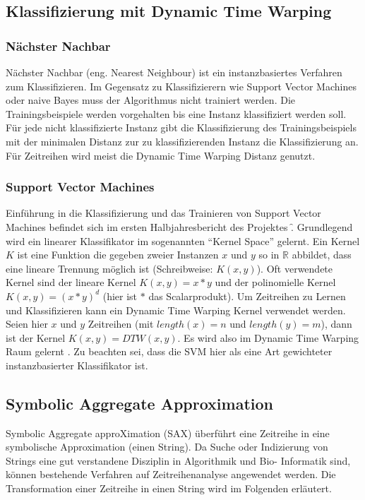 \subsection{Klassifizierung mit Dynamic Time Warping}
\subsubsection{Nächster Nachbar} Nächster Nachbar (eng. Nearest
Neighbour) ist ein instanzbasiertes Verfahren zum Klassifizieren. Im
Gegensatz zu Klassifizierern wie Support Vector Machines oder naive
Bayes muss der Algorithmus nicht trainiert werden. Die
Trainingsbeispiele werden vorgehalten bis eine Instanz klassifiziert
werden soll. Für jede nicht klassifizierte Instanz gibt die
Klassifizierung des Trainingsbeispiels mit der minimalen Distanz zur
zu klassifizierenden Instanz die Klassifizierung an.  Für Zeitreihen
wird meist die Dynamic Time Warping Distanz genutzt.
\subsubsection{Support Vector Machines} %
Einführung in die Klassifizierung und das Trainieren von Support
Vector Machines befindet sich im ersten Halbjahresbericht des
Projektes \f. Grundlegend wird ein linearer Klassifikator im
sogenannten ``Kernel Space'' gelernt. Ein Kernel $K$ ist eine Funktion
die gegeben zweier Instanzen $x$ und $y$ so in $\mathbb{R}$ abbildet,
dass eine lineare Trennung möglich ist (Schreibweise: $K(x, y)$). Oft
verwendete Kernel sind der lineare Kernel $K(x,y) = x * y$ und der
polinomielle Kernel $K(x,y) = ( x * y) ^d$ (hier ist $*$ das
Scalarprodukt). Um Zeitreihen zu Lernen und Klassifizieren kann ein
Dynamic Time Warping Kernel verwendet werden. Seien hier $x$ und $y$
Zeitreihen (mit $length(x) = n$ und $length(y) = m$), dann ist der
Kernel $K(x,y) = DTW(x,y)$. Es wird also im Dynamic Time Warping Raum
gelernt \cite{svm_dtw}. Zu beachten sei, dass die SVM hier als eine
Art gewichteter instanzbasierter Klassifikator ist.

\subsection{Symbolic Aggregate Approximation} Symbolic Aggregate
approXimation (SAX) \cite{lin07} überführt eine Zeitreihe in eine
symbolische Approximation (einen String).  Da Suche oder Indizierung
von Strings eine gut verstandene Disziplin in Algorithmik und Bio-
Informatik sind, können bestehende Verfahren auf Zeitreihenanalyse
angewendet werden.  Die Transformation einer Zeitreihe in einen String
wird im Folgenden erläutert.

